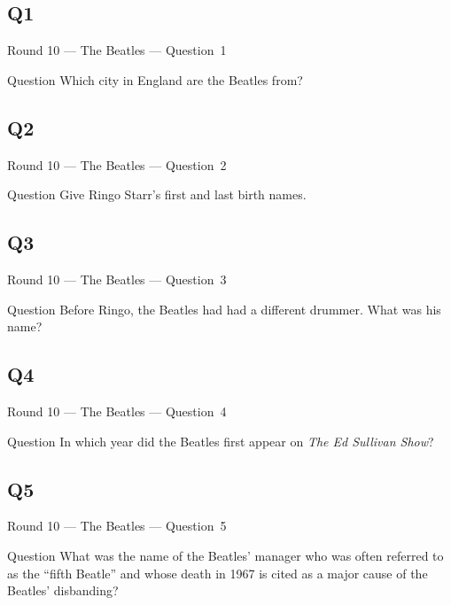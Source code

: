 \documentclass[11pt]{beamer}
\begin{document}
\subsection*{Q1}
\begin{frame}[t]{Round 10 --- The Beatles --- \mbox{Question 1}}
\vspace{-0.5em}
\begin{block}{Question}
Which city in England are the Beatles from?
\end{block}
\end{frame}
\subsection*{Q2}
\begin{frame}[t]{Round 10 --- The Beatles --- \mbox{Question 2}}
\vspace{-0.5em}
\begin{block}{Question}
Give Ringo Starr's first  and last birth names.
\end{block}
\end{frame}
\subsection*{Q3}
\begin{frame}[t]{Round 10 --- The Beatles --- \mbox{Question 3}}
\vspace{-0.5em}
\begin{block}{Question}
Before Ringo, the Beatles had had a different drummer. What was his name?
\end{block}
\end{frame}
\subsection*{Q4}
\begin{frame}[t]{Round 10 --- The Beatles --- \mbox{Question 4}}
\vspace{-0.5em}
\begin{block}{Question}
In which year did the Beatles first appear on \emph{The Ed Sullivan Show}?
\end{block}
\end{frame}
\subsection*{Q5}
\begin{frame}[t]{Round 10 --- The Beatles --- \mbox{Question 5}}
\vspace{-0.5em}
\begin{block}{Question}
What was the name of the Beatles' manager who was often referred to as the ``fifth Beatle'' and whose death in 1967 is cited as a major cause of the Beatles' disbanding?
\end{block}
\end{frame}
\end{document}
